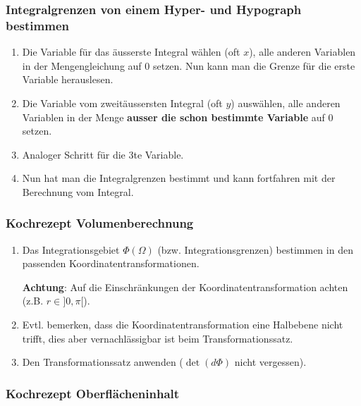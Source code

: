 \documentclass[a4paper, fontsize = 8pt, landscape]{scrartcl}
\begin{document}
\begin{multicols*}{3}
\begin{small}
        \subsubsection{Integralgrenzen von einem Hyper- und Hypograph bestimmen}

        \begin{enumerate}
            \item Die Variable für das äusserste Integral wählen (oft $x$), alle anderen Variablen in der Mengengleichung auf $0$ setzen. Nun kann man die Grenze für die erste Variable herauslesen.
            \item Die Variable vom zweitäussersten Integral (oft $y$) auswählen, alle anderen Variablen in der Menge \textbf{ausser die schon bestimmte Variable} auf $0$ setzen.
            \item[2.5] Analoger Schritt für die 3te Variable.
            \item Nun hat man die Integralgrenzen bestimmt und kann fortfahren mit der Berechnung vom Integral.
        \end{enumerate}


        \subsubsection{Kochrezept Volumenberechnung}

        \begin{enumerate}
            \item Das Integrationsgebiet $\Phi(\Omega)$ (bzw. Integrationsgrenzen) bestimmen in den passenden Koordinatentransformationen.

                  \textbf{Achtung}: Auf die Einschränkungen der Koordinatentransformation achten (z.B. $r \in ]0,\pi[$).
            \item[1.5] Evtl. bemerken, dass die Koordinatentransformation eine Halbebene nicht trifft, dies aber vernachlässigbar ist beim Transformationssatz.
            \item Den Transformationssatz anwenden ($\det(d\Phi)$ nicht vergessen).
        \end{enumerate}


        \subsubsection{Kochrezept Oberflächeninhalt}


\end{small}
\end{multicols*}
\end{document}
